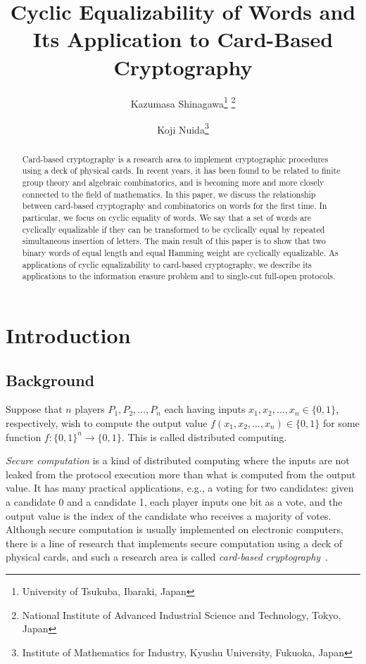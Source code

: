 \documentclass{article}
\title{Cyclic Equalizability of Words and Its Application to Card-Based Cryptography}
\author{Kazumasa Shinagawa\thanks{University of Tsukuba, Ibaraki, Japan} \thanks{National Institute of Advanced Industrial Science and Technology, Tokyo, Japan} \and Koji Nuida\thanks{Institute of Mathematics for Industry, Kyushu University, Fukuoka, Japan} \samethanks[2]}
\theoremstyle{definition}
\newcommand{\bin}{\{0,1\}}
\newcommand{\ra}{\rightarrow}
\begin{document}
\maketitle              %
%
\begin{abstract}
Card-based cryptography is a research area to implement cryptographic procedures using a deck of physical cards. In recent years, it has been found to be related to finite group theory and algebraic combinatorics, and is becoming more and more closely connected to the field of mathematics. In this paper, we discuss the relationship between card-based cryptography and combinatorics on words for the first time. In particular, we focus on cyclic equality of words. We say that a set of words are cyclically equalizable if they can be transformed to be cyclically equal by repeated simultaneous insertion of letters. The main result of this paper is to show that two binary words of equal length and equal Hamming weight are cyclically equalizable. As applications
of cyclic equalizability to card-based cryptography, we describe its applications to the information erasure problem and to single-cut full-open protocols. 
\end{abstract}
%
%
%
\section{Introduction}

\subsection{Background}

Suppose that $n$ players $P_1, P_2, \ldots, P_n$ each having inputs $x_1, x_2, \ldots, x_n \in \bin$, respectively, wish to compute the output value $f(x_1, x_2, \ldots, x_n) \in \bin$ for some function $f\colon \bin^n \ra \bin$. 
This is called distributed computing. 

\emph{Secure computation} is a kind of distributed computing where the inputs are not leaked from the protocol execution more than what is computed from the output value. 
It has many practical applications, e.g., a voting for two candidates: given a candidate 0 and a candidate 1, each player inputs one bit as a vote, and the output value is the index of the candidate who receives a majority of votes. 
Although secure computation is usually implemented on electronic computers, there is a line of research that implements secure computation using a deck of physical cards, and such a research area is called \emph{card-based cryptography}~\cite{BoerEC1989, KilianC1994,MizukiIJIS2014}. 
\end{document}
